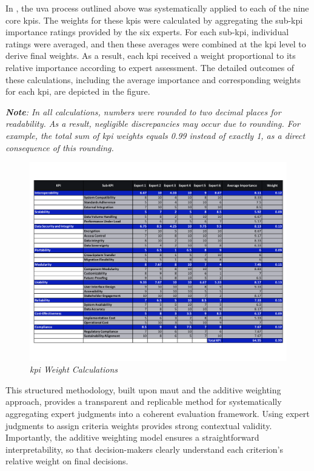 In , the \ac{uva} process outlined above was systematically applied to each of the nine core \ac{kpi}s. The weights for these \ac{kpi}s were calculated by aggregating the sub-\ac{kpi} importance ratings provided by the six experts. For each sub-\ac{kpi}, individual ratings were averaged, and then these averages were combined at the \ac{kpi} level to derive final weights. As a result, each \ac{kpi} received a weight proportional to its relative importance according to expert assessment. The detailed outcomes of these calculations, including the average importance and corresponding weights for each \ac{kpi}, are depicted in the figure.

\textit{\textbf{Note}: In all calculations, numbers were rounded to two decimal places for readability. As a result, negligible discrepancies may occur due to rounding. For example, the total sum of \ac{kpi} weights equals 0.99 instead of exactly 1, as a direct consequence of this rounding.}

\begin{figure}[htbp]
  \centering
  \includegraphics[width=\textwidth]{figures/expert_kpi_calculations.pdf}
  \caption{%
    \textit{\ac{kpi} Weight Calculations} 
  }
  \label{fig:expert_kpi_calculations}
\end{figure}

This structured methodology, built upon \ac{maut} and the additive weighting approach, provides a transparent and replicable method for systematically aggregating expert judgments into a coherent evaluation framework. Using expert judgments to assign criteria weights provides strong contextual validity. Importantly, the additive weighting model ensures a straightforward interpretability, so that decision-makers clearly understand each criterion's relative weight on final decisions. \autocite{Keeney.1979, Belton.2002, Hwang.1981, Triantaphyllou.2000}


